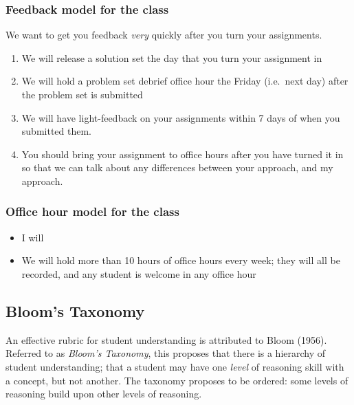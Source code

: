 \documentclass[
]{article}
\providecommand{\tightlist}{%
  \setlength{\itemsep}{0pt}\setlength{\parskip}{0pt}}
\theoremstyle{definition}
\theoremstyle{definition}
\theoremstyle{definition}
\theoremstyle{definition}
\theoremstyle{remark}
\begin{document}
\subsubsection{Feedback model for the class}\label{feedback-model-for-the-class}

We want to get you feedback \emph{very} quickly after you turn your assignments.

\begin{enumerate}
\def\labelenumi{\arabic{enumi}.}
\tightlist
\item
  We will release a solution set the day that you turn your assignment in
\item
  We will hold a problem set debrief office hour the Friday (i.e.~next day) after the problem set is submitted
\item
  We will have light-feedback on your assignments within 7 days of when you submitted them.
\item
  You should bring your assignment to office hours after you have turned it in so that we can talk about any differences between your approach, and my approach.
\end{enumerate}

\subsubsection{Office hour model for the class}\label{office-hour-model-for-the-class}

\begin{itemize}
\tightlist
\item
  I will
\item
  We will hold more than 10 hours of office hours every week; they will all be recorded, and any student is welcome in any office hour
\end{itemize}

\subsection*{Bloom's Taxonomy}\label{blooms-taxonomy}

An effective rubric for student understanding is attributed to Bloom (1956). Referred to as \emph{Bloom's Taxonomy}, this proposes that there is a hierarchy of student understanding; that a student may have one \emph{level} of reasoning skill with a concept, but not another. The taxonomy proposes to be ordered: some levels of reasoning build upon other levels of reasoning.
\end{document}
